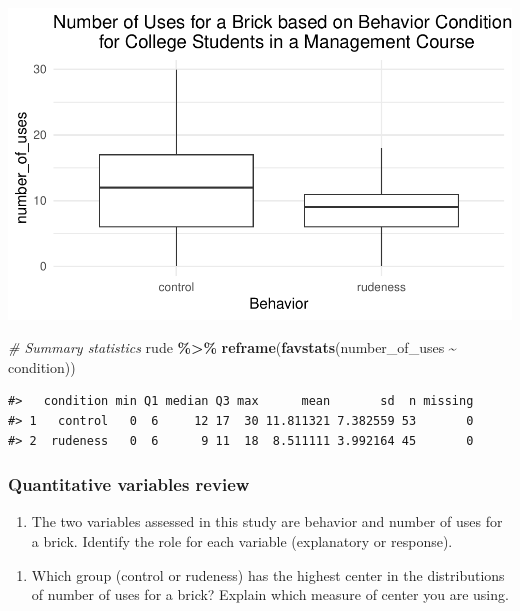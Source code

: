 \documentclass[
]{report}
\newenvironment{Shaded}{\begin{snugshade}}{\end{snugshade}}
\newcommand{\CommentTok}[1]{\textcolor[rgb]{0.56,0.35,0.01}{\textit{#1}}}
\newcommand{\FunctionTok}[1]{\textcolor[rgb]{0.13,0.29,0.53}{\textbf{#1}}}
\newcommand{\NormalTok}[1]{#1}
\newcommand{\SpecialCharTok}[1]{\textcolor[rgb]{0.81,0.36,0.00}{\textbf{#1}}}
\providecommand{\tightlist}{%
  \setlength{\itemsep}{0pt}\setlength{\parskip}{0pt}}
\begin{document}
\begin{center}\includegraphics[width=0.6\linewidth]{12-OCA09-inference-1ofeach-simulation_files/figure-latex/unnamed-chunk-2-1} \end{center}

\begin{Shaded}
\begin{Highlighting}[]
\CommentTok{\# Summary statistics}
\NormalTok{rude }\SpecialCharTok{\%\textgreater{}\%} 
     \FunctionTok{reframe}\NormalTok{(}\FunctionTok{favstats}\NormalTok{(number\_of\_uses }\SpecialCharTok{\textasciitilde{}}\NormalTok{ condition))}
\end{Highlighting}
\end{Shaded}

\begin{verbatim}
#>   condition min Q1 median Q3 max      mean       sd  n missing
#> 1   control   0  6     12 17  30 11.811321 7.382559 53       0
#> 2  rudeness   0  6      9 11  18  8.511111 3.992164 45       0
\end{verbatim}

\hypertarget{quantitative-variables-review}{%
\subsubsection*{Quantitative variables review}\label{quantitative-variables-review}}

\begin{enumerate}
\def\labelenumi{\arabic{enumi}.}
\tightlist
\item
  The two variables assessed in this study are behavior and number of uses for a brick. Identify the role for each variable (explanatory or response).
\end{enumerate}

\vspace{.4in}

\begin{enumerate}
\def\labelenumi{\arabic{enumi}.}
\setcounter{enumi}{1}
\tightlist
\item
  Which group (control or rudeness) has the highest center in the distributions of number of uses for a brick? Explain which measure of center you are using.
\end{enumerate}
\end{document}
